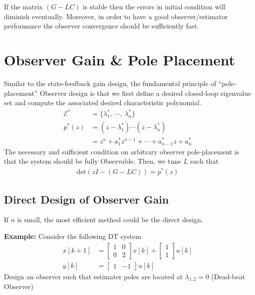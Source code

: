 \documentclass[twoside]{article}
\begin{document}
If the matrix $\left( G - L C \right)$ is stable then the errors in
initial condition will diminish eventually. Moreover, in order
to have a good observer/estimator performance the observer
convergence should be sufficiently fast. 

\newpage

\section*{Observer Gain \& Pole Placement}

Similar to the state-feedback gain design,
the fundamental principle of ``pole-placement'' Observer design is that
we first define a desired closed-loop eigenvalue set and 
compute the associated desired characteristic polynomial. 
%
\begin{align*}
 \mathcal{E}^* &= \lbrace \lambda_1^* , \ \cdots, \  \lambda_n^*
                 \rbrace
  \\
  p^*(z) &= \left( z - \lambda_1^* \right) \cdots \left( z - \lambda_n^*
         \right)                         
  \\
  &= z^n + a_1^* z^{n-1} + \cdots + a_{n-1}^* z + a_n^*
\end{align*}
%
The necessary and sufficient condition on arbitrary observer pole-placement
is that the system should be fully Observable. Then, we tune $L$ such
that 
%
\begin{align*}
  \mathrm{det} \left( z I - ( G - L C ) \right) = p^*(z)
\end{align*}
%
\subsection*{Direct Design of Observer Gain}

If $n$ is small, the most efficient method could be the direct
design. 

\textbf{Example:} Consider the following DT system
%
\begin{align*}
 x[k+1] &= \left[ \begin{array}{cc} 1 & 0 \\ 0 & 2 \end{array} \right] x[k]
    + \left[ \begin{array}{c} 1 \\ 1 \end{array} \right] u[k]
\\
 y[k] &= \left[ \begin{array}{cc} 1 & -1 \end{array} \right] u[k]
\end{align*}
% 
Design an observer such that estimater poles are located at 
$\lambda_{1,2} = 0$ (Dead-beat Observer)
\end{document}
